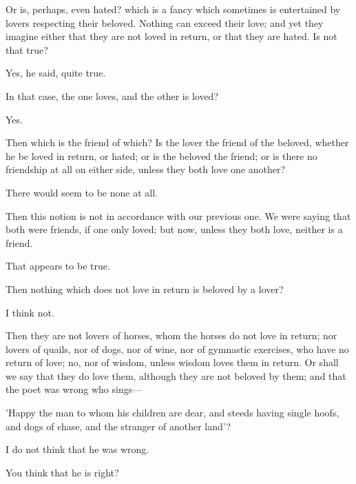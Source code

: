 \documentclass[11pt,letter]{article}
\begin{document}
\par  Or is, perhaps, even hated? which is a fancy which sometimes is entertained by lovers respecting their beloved. Nothing can exceed their love; and yet they imagine either that they are not loved in return, or that they are hated. Is not that true?

\par  Yes, he said, quite true.

\par  In that case, the one loves, and the other is loved?

\par  Yes.

\par  Then which is the friend of which? Is the lover the friend of the beloved, whether he be loved in return, or hated; or is the beloved the friend; or is there no friendship at all on either side, unless they both love one another?

\par  There would seem to be none at all.

\par  Then this notion is not in accordance with our previous one. We were saying that both were friends, if one only loved; but now, unless they both love, neither is a friend.

\par  That appears to be true.

\par  Then nothing which does not love in return is beloved by a lover?

\par  I think not.

\par  Then they are not lovers of horses, whom the horses do not love in return; nor lovers of quails, nor of dogs, nor of wine, nor of gymnastic exercises, who have no return of love; no, nor of wisdom, unless wisdom loves them in return. Or shall we say that they do love them, although they are not beloved by them; and that the poet was wrong who sings—

\par  'Happy the man to whom his children are dear, and steeds having single hoofs, and dogs of chase, and the stranger of another land'?

\par  I do not think that he was wrong.

\par  You think that he is right?
\end{document}
